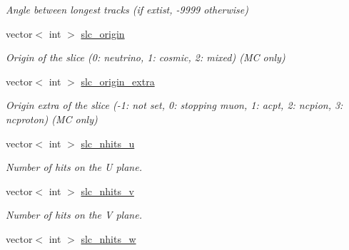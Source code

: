 \begin{DoxyCompactItemize}
\begin{DoxyCompactList}\small\item\em Angle between longest tracks (if extist, -\/9999 otherwise) \end{DoxyCompactList}\item 
\hypertarget{classUBXSecEvent_aebb1b1e843015c57cd10b411682dbb2e}{vector$<$ int $>$ \hyperlink{classUBXSecEvent_aebb1b1e843015c57cd10b411682dbb2e}{slc\-\_\-origin}}\label{classUBXSecEvent_aebb1b1e843015c57cd10b411682dbb2e}

\begin{DoxyCompactList}\small\item\em Origin of the slice (0\-: neutrino, 1\-: cosmic, 2\-: mixed) (M\-C only) \end{DoxyCompactList}\item 
\hypertarget{classUBXSecEvent_ac1532ccdcb92b158c2393ec6a2a816f8}{vector$<$ int $>$ \hyperlink{classUBXSecEvent_ac1532ccdcb92b158c2393ec6a2a816f8}{slc\-\_\-origin\-\_\-extra}}\label{classUBXSecEvent_ac1532ccdcb92b158c2393ec6a2a816f8}

\begin{DoxyCompactList}\small\item\em Origin extra of the slice (-\/1\-: not set, 0\-: stopping muon, 1\-: acpt, 2\-: ncpion, 3\-: ncproton) (M\-C only) \end{DoxyCompactList}\item 
\hypertarget{classUBXSecEvent_a52bec741eadb5ef5f4bf1c2322707d20}{vector$<$ int $>$ \hyperlink{classUBXSecEvent_a52bec741eadb5ef5f4bf1c2322707d20}{slc\-\_\-nhits\-\_\-u}}\label{classUBXSecEvent_a52bec741eadb5ef5f4bf1c2322707d20}

\begin{DoxyCompactList}\small\item\em Number of hits on the U plane. \end{DoxyCompactList}\item 
\hypertarget{classUBXSecEvent_a5ade1b25620def646196c0d7fa3ad7f3}{vector$<$ int $>$ \hyperlink{classUBXSecEvent_a5ade1b25620def646196c0d7fa3ad7f3}{slc\-\_\-nhits\-\_\-v}}\label{classUBXSecEvent_a5ade1b25620def646196c0d7fa3ad7f3}

\begin{DoxyCompactList}\small\item\em Number of hits on the V plane. \end{DoxyCompactList}\item 
\hypertarget{classUBXSecEvent_ac20d2a610a09c19bb6c10e80ec735b12}{vector$<$ int $>$ \hyperlink{classUBXSecEvent_ac20d2a610a09c19bb6c10e80ec735b12}{slc\-\_\-nhits\-\_\-w}}\label{classUBXSecEvent_ac20d2a610a09c19bb6c10e80ec735b12}


\end{DoxyCompactItemize}
